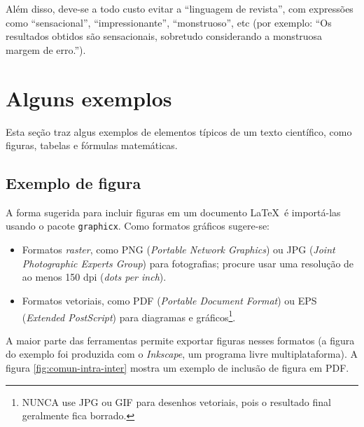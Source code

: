 Além disso, deve-se a todo custo evitar a ``linguagem de revista'', com expressões como ``sensacional'', ``impressionante'', ``monstruoso'', etc (por exemplo: ``Os resultados obtidos são sensacionais, sobretudo considerando a monstruosa margem de erro.'').


\section{Alguns exemplos}

Esta seção traz algus exemplos de elementos típicos de um texto científico, como figuras, tabelas e fórmulas matemáticas.


\subsection{Exemplo de figura}

A forma sugerida para incluir figuras em um documento \LaTeX\ é importá-las usando o pacote \texttt{graphicx}. Como formatos gráficos sugere-se:

\begin{itemize}

\item Formatos \emph{raster}, como PNG (\emph{Portable Network Graphics}) ou JPG (\emph{Joint Photographic Experts Group}) para fotografias; procure usar uma resolução de ao menos 150 dpi (\emph{dots per inch}).

\item Formatos vetoriais, como PDF (\emph{Portable Document Format}) ou EPS (\emph{Extended PostScript}) para diagramas e gráficos\footnote{NUNCA use JPG ou GIF para desenhos vetoriais, pois o resultado final geralmente fica borrado.}.

\end{itemize}

A maior parte das ferramentas permite exportar figuras nesses formatos (a figura do exemplo foi produzida com o \emph{Inkscape}, um programa livre multiplataforma). A figura \ref{fig:comun-intra-inter} mostra um exemplo de inclusão de figura em PDF.

